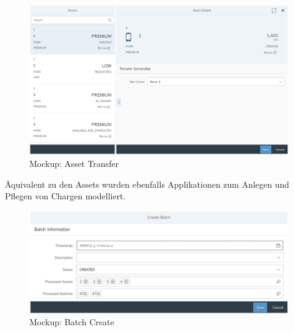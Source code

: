 \begin{figure}[H]
	\centering
	\includegraphics[width=1\linewidth]{pictures/ui-transfer-asset}
	\caption[Mockup: Asset Transfer]{Mockup: Asset Transfer}
	\label{fig:ui-transfer-asset}
\end{figure}

Äquivalent zu den Assets wurden ebenfalls Applikationen zum Anlegen und Pflegen von Chargen modelliert. 

\begin{figure}[H]
	\centering
	\includegraphics[width=1\linewidth]{pictures/ui-create-batch}
	\caption[Mockup: Batch Create]{Mockup: Batch Create}
	\label{fig:ui-create-batch}
\end{figure}



